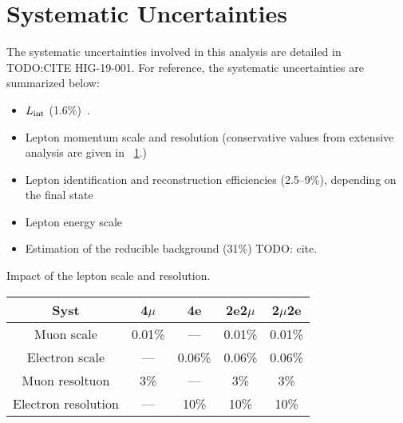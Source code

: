 \section{Systematic Uncertainties}
\label{sec:syst_uncert}
The systematic uncertainties involved in this analysis are detailed in TODO:CITE HIG-19-001.
For reference, the systematic uncertainties are summarized below:
\begin{itemize}
	\item $L_\text{int}$ (1.6\%)~\cite{LUM-17-003, LUM-17-004, LUM-18-002}.
	\item Lepton momentum scale and resolution (conservative values from extensive analysis are given in \tablename~\ref{table:ScaleRes_syst}.)
	\item Lepton identification and reconstruction efficiencies (2.5--9\%), depending on the final state %
	\item Lepton energy scale
	\item Estimation of the reducible background (31\%) TODO: cite.
\end{itemize}
\begin{table}[ht]
	\begin{center}
		\topcaption
		{Impact of the lepton scale and resolution.}
                \begin{tabular}{ccccc}
		\hline
		Syst	&	4$\mu$	&	4e	&	2e2$\mu$	&	2$\mu$2e	\\
		\hline
		Muon scale	&	0.01\%	&	---	&	0.01\%	&	0.01\%	\\
		Electron scale	&	---	&	0.06\%	&	0.06\%	&	0.06\%	\\
		\hline
		Muon resoltuon	&	3\%	&	---	&	3\%	&	3\%	\\
		Electron resolution	&	---	&	10\%	&       10\%&       10\%	\\
		\hline
		\end{tabular}
		\label{table:ScaleRes_syst}
	\end{center}
\end{table}

